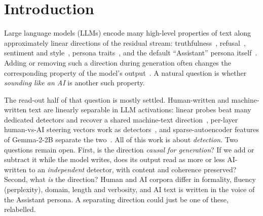 \section{Introduction}
\label{sec:intro}

Large language models (LLMs) encode many high-level properties of text along approximately linear directions of the residual stream: truthfulness~\citep{marks2024geometry,li2023inference}, refusal~\citep{arditi2024refusal}, sentiment and style~\citep{turner2023steering,konen2024style}, persona traits~\citep{chen2025persona}, and the default ``Assistant'' persona itself~\citep{lu2026assistant}. Adding or removing such a direction during generation often changes the corresponding property of the model's output~\citep{zou2023representation,rimsky2024steering}. A natural question is whether \emph{sounding like an AI} is another such property.

The read-out half of that question is mostly settled. Human-written and machine-written text are linearly separable in LLM activations: linear probes beat many dedicated detectors and recover a shared machine-text direction~\citep{quaremba2026linear}, per-layer human-vs-AI steering vectors work as detectors~\citep{vishnyakov2026svdetect}, and sparse-autoencoder features of Gemma-2-2B separate the two~\citep{kuznetsov2025feature}. All of this work is about \emph{detection}. Two questions remain open. First, is the direction \emph{causal for generation}? If we add or subtract it while the model writes, does its output read as more or less AI-written to an \emph{independent} detector, with content and coherence preserved? Second, what \emph{is} the direction? Human and AI corpora differ in formality, fluency (perplexity), domain, length and verbosity, and AI text is written in the voice of the Assistant persona. A separating direction could just be one of these, relabelled.

